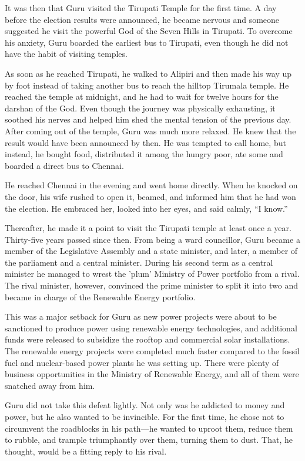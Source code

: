 It was then that Guru visited the Tirupati Temple for the first time. A day before the
election results were announced, he became nervous and someone suggested he
visit the powerful God of the Seven Hills in Tirupati. To overcome his anxiety,
Guru boarded the earliest bus to Tirupati, even though he did not have the
habit of visiting temples.

As soon as he reached Tirupati, he walked to Alipiri and then made his way
up by foot instead of taking another bus to reach the hilltop Tirumala temple.
He reached the temple at midnight, and he had to wait for twelve hours for
the darshan of the God. Even though the journey was physically exhausting, it
soothed his nerves and helped him shed the mental tension of the 
previous day. After coming out of the temple, Guru was much more relaxed. He
knew that the result would have been announced by then. He was tempted to call
home, but instead, he bought food, distributed it among the hungry poor, ate some
and boarded a direct bus to Chennai.

He reached Chennai in the evening and went home directly. When he knocked on the
door, his
wife rushed to open it, beamed, and informed him that he had won the election. He
embraced her, looked into her eyes, and said calmly, “I know.”

Thereafter, he made it a point to visit the Tirupati temple at least once a
year. Thirty-five years passed since then. From being a ward councillor, Guru
became a member of the Legislative Assembly and a state minister, and later,
a member of the parliament and a central minister. During his second term as a central
minister he managed to wrest the 'plum' Ministry of Power portfolio from a rival.
The rival minister, however, convinced the prime minister to split it
into two and became in charge of the Renewable Energy portfolio.

This was a major setback for Guru as new power projects were about to be
sanctioned to produce power using renewable energy technologies, and additional
funds were released to subsidize the rooftop and commercial solar installations.
The renewable energy projects were completed much faster compared to the
fossil fuel and nuclear-based power plants he was setting up. There were plenty of
business opportunities in the Ministry of Renewable Energy, and all of them were
snatched away from him.

Guru did not take this defeat lightly. Not only was he addicted to money and
power, but he also wanted to be invincible. For the first time, he chose not to
circumvent the roadblocks in his path—he wanted to uproot them, reduce them to
rubble, and trample triumphantly over them, turning them to dust. That, he thought,
would be a fitting reply to his rival.
